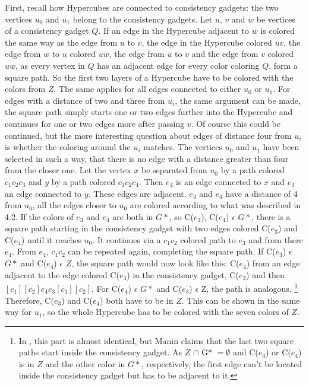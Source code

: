 \documentclass[12pt,a4paper]{article}
\begin{document}
First, recall how Hypercubes are connected to consistency gadgets: the two vertices $u_0$ and $u_1$ belong to the consistency gadgets. Let $u$, $v$ and $w$ be vertices of a consistency gadget $Q$. If an edge in the Hypercube adjacent to $w$ is colored the same way as the edge from $u$ to $v$, the edge in the Hypercube colored $uv$, the edge from $w$ to $u$ colored $uw$, the edge from $u$ to $v$ and the edge from $v$ colored $uw$, as every vertex in $Q$ has an adjacent edge for every color coloring $Q$, form a square path. So the first two layers of a Hypercube have to be colored with the colors from $Z$. The same applies for all edges connected to either $u_0$ or $u_1$. For edges with a distance of two and three from $u_i$, the same argument can be made, the square path simply starts one or two edges further into the Hypercube and continues for one or two edges more after passing $v$. Of course this could be continued, but the more interesting question about edges of distance four from $u_i$ is whether the coloring around the $u_i$ matches. The vertices $u_0$ and $u_1$ have been selected in such a way, that there is no edge with a distance greater than four from the closer one. Let the vertex $x$ be separated from $u_0$ by a path colored $c_1c_2c_3$ and $y$ by a path colored $c_1c_2c_4$. Then $e_4$ is an edge connected to $x$ and $e_3$ an edge connected to $y$. These edges are adjacent. $e_3$ and $e_4$ have a distance of 4 from $u_0$, all the edges closer to $u_0$ are colored according to what was described in 4.2. If the colors of $e_3$ and $e_4$ are both in $G*$, so C($e_3$), C($e_4$) $\epsilon$ $G*$, there is a square path starting in the consistency gadget with two edges colored C($e_3$) and C($e_4$) until it reaches $u_0$. It continues via a $c_1c_2$ colored path to $e_3$ and from there $e_4$. From $e_4$, $c_1c_2$ can be repeated again, completing the square path. If C($e_3$) $\epsilon$ $G*$ and C($e_4$) $\epsilon$ $Z$, the square path would now look like this: C($e_4$) from an edge adjacent to the edge colored C($e_3$) in the consistency gadget, C($e_3$) and then $[c_1][c_2]e_4e_3[c_1][c_2]$. For C($e_4$) $\epsilon$ $G*$ and C($e_3$) $\epsilon$ Z, the path is analogous. \footnote{In \citep{Manin2008}, this part is almost identical, but Manin claims that the last two square paths start inside the consistency gadget. As $Z$ $\cap$ G* $= \emptyset$ and C($e_3$) or C($e_4$) is in $Z$ and the other color in $G*$, respectively, the first edge can't be located inside the consistency gadget but has to be adjacent to it.} Therefore, C($e_3$) and C($e_4$) both have to be in $Z$. This can be shown in the same way for $u_1$, so the whole Hypercube has to be colored with the seven colors of $Z$. 
\end{document}
